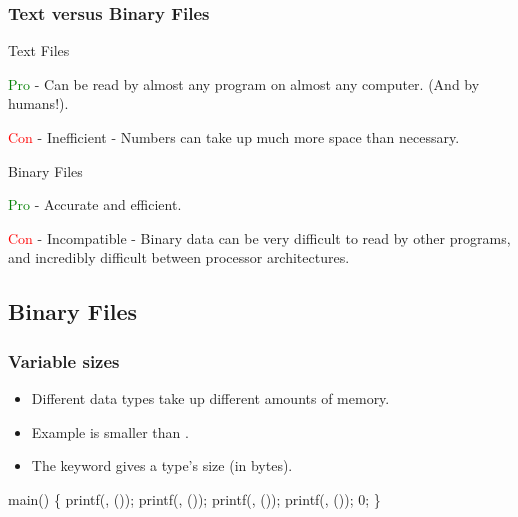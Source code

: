 \documentclass[smaller,table]{beamer}
\begin{document}
\begin{frame}
\frametitle{Text versus Binary Files}
\begin{block}{Text Files}
\begin{itemize}
{
\item \textcolor{green}{Pro} - Can be read by almost any program on almost any computer. (And by humans!).
}
{
\item \textcolor{red}{Con} - Inefficient - Numbers can take up much more space than necessary.}
\end{itemize}
\end{block}

\begin{block}{Binary Files}
\begin{itemize}
{
\item \textcolor{green}{Pro} - Accurate and efficient.
}
{
\item \textcolor{red}{Con} - Incompatible - Binary data can be very difficult to read by other programs, and incredibly difficult between processor architectures.}
\end{itemize}
\end{block}
\end{frame}

\subsection{Binary Files}
\begin{frame}[fragile]
\frametitle{Variable sizes}
\begin{itemize}
\item Different data types take up different amounts of memory.
\item Example  is smaller than .
\item The  keyword gives a type's size (in bytes).
\end{itemize}

{
\small
\begin{semiverbatim}
 

 main()
\{
   printf(, ());
   printf(, ());
   printf(, ());
   printf(, ());
    0;
\}
\end{semiverbatim}
}
\end{frame}
\end{document}
